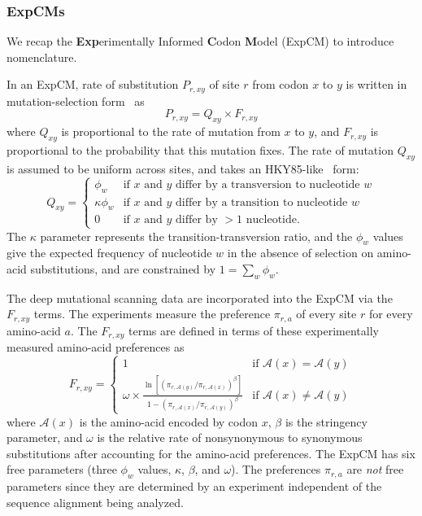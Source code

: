 \documentclass[11pt]{article}
\begin{document}
\subsubsection*{ExpCMs}
We recap the \textbf{Exp}erimentally Informed \textbf{C}odon \textbf{M}odel (ExpCM) \citep{bloom2014experimentally,bloom2014informed,bloom2017identification,hilton2017phydms} to introduce nomenclature. 

In an ExpCM, rate of substitution $P_{r,xy}$ of site $r$ from codon $x$ to $y$ is written in mutation-selection form~\citep{halpern1998evolutionary,mccandlish2014modeling,spielman2015relationship} as
\begin{equation}
P_{r,xy} = Q_{xy} \times F_{r,xy}
\end{equation}
where $Q_{xy}$ is proportional to the rate of mutation from $x$ to $y$, and $F_{r,xy}$ is proportional to the probability that this mutation fixes.
The rate of mutation $Q_{xy}$ is assumed to be uniform across sites, and takes an HKY85-like~\citep{hasegawa1985dating} form:
\begin{equation}
Q_{xy} = 
\begin{cases}
\phi_w & \mbox{if $x$ and $y$ differ by a transversion to nucleotide $w$} \\
\kappa \phi_w & \mbox{if $x$ and $y$ differ by a transition to nucleotide $w$} \\
0 & \mbox{if $x$ and $y$ differ by $>1$ nucleotide.}
\end{cases}
\end{equation}
The $\kappa$ parameter represents the transition-transversion ratio, and the $\phi_w$ values give the expected frequency of nucleotide $w$ in the absence of selection on amino-acid substitutions, and are constrained by $1 = \sum_w \phi_w$.

The deep mutational scanning data are incorporated into the ExpCM via the $F_{r,xy}$ terms.
The experiments measure the preference $\pi_{r,a}$ of every site $r$ for every amino-acid $a$.
The $F_{r,xy}$ terms are defined in terms of these experimentally measured amino-acid preferences as
\begin{equation}
\label{eq:Frxy}
F_{r,xy} = 
\begin{cases}
   1 & \mbox{if $\mathcal{A}\left(x\right) = \mathcal{A}\left(y\right)$} \\
   \omega \times \frac{\ln\left[\left(\pi_{r,\mathcal{A}\left(y\right)} / \pi_{r,\mathcal{A}\left(x\right)}\right)^{\beta}\right]}{1 - \left(\pi_{r,\mathcal{A}\left(x\right)} / \pi_{r,\mathcal{A}\left(y\right)}\right)^{\beta}} & \mbox{if $\mathcal{A}\left(x\right) \ne \mathcal{A}\left(y\right)$}
   \end{cases}
\end{equation}
where $\mathcal{A}\left(x\right)$ is the amino-acid encoded by codon $x$, $\beta$ is the stringency parameter, and $\omega$ is the relative rate of nonsynonymous to synonymous substitutions after accounting for the amino-acid preferences.
The ExpCM has six free parameters (three $\phi_w$ values, $\kappa$, $\beta$, and $\omega$).
The preferences $\pi_{r,a}$ are \emph{not} free parameters since they are determined by an experiment independent of the sequence alignment being analyzed.
\end{document}

